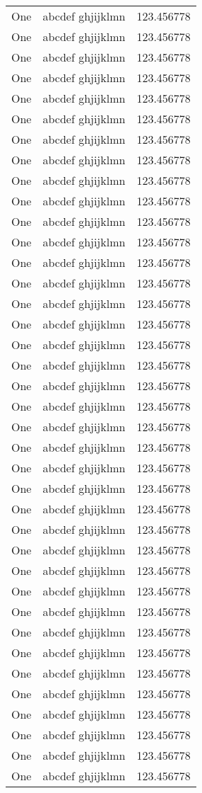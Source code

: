 \documentclass{book}
\begin{document}
\begin{center}
\begin{longtable}{|l|l|l|}
One & abcdef ghjijklmn & 123.456778 \\
One & abcdef ghjijklmn & 123.456778 \\
One & abcdef ghjijklmn & 123.456778 \\
One & abcdef ghjijklmn & 123.456778 \\
One & abcdef ghjijklmn & 123.456778 \\
One & abcdef ghjijklmn & 123.456778 \\
One & abcdef ghjijklmn & 123.456778 \\
One & abcdef ghjijklmn & 123.456778 \\
One & abcdef ghjijklmn & 123.456778 \\
One & abcdef ghjijklmn & 123.456778 \\
One & abcdef ghjijklmn & 123.456778 \\
One & abcdef ghjijklmn & 123.456778 \\
One & abcdef ghjijklmn & 123.456778 \\
One & abcdef ghjijklmn & 123.456778 \\
One & abcdef ghjijklmn & 123.456778 \\
One & abcdef ghjijklmn & 123.456778 \\
One & abcdef ghjijklmn & 123.456778 \\
One & abcdef ghjijklmn & 123.456778 \\
One & abcdef ghjijklmn & 123.456778 \\
One & abcdef ghjijklmn & 123.456778 \\
One & abcdef ghjijklmn & 123.456778 \\
One & abcdef ghjijklmn & 123.456778 \\
One & abcdef ghjijklmn & 123.456778 \\
One & abcdef ghjijklmn & 123.456778 \\
One & abcdef ghjijklmn & 123.456778 \\
One & abcdef ghjijklmn & 123.456778 \\
One & abcdef ghjijklmn & 123.456778 \\
One & abcdef ghjijklmn & 123.456778 \\
One & abcdef ghjijklmn & 123.456778 \\
One & abcdef ghjijklmn & 123.456778 \\
One & abcdef ghjijklmn & 123.456778 \\
One & abcdef ghjijklmn & 123.456778 \\
One & abcdef ghjijklmn & 123.456778 \\
One & abcdef ghjijklmn & 123.456778 \\
One & abcdef ghjijklmn & 123.456778 \\
One & abcdef ghjijklmn & 123.456778 \\
One & abcdef ghjijklmn & 123.456778 \\
One & abcdef ghjijklmn & 123.456778 \\





\end{longtable}
\end{center}
\end{document}

